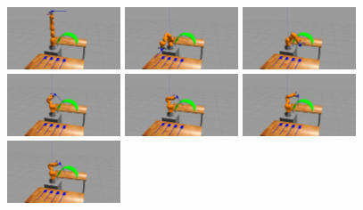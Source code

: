 \begin{center}
\begin{figure}[!htb]
\centering
\includegraphics[width=0.3\textwidth]{images/robot_planner1/robot_planner1_1}
\includegraphics[width=0.3\textwidth]{images/robot_planner1/robot_planner1_2}
\includegraphics[width=0.3\textwidth]{images/robot_planner1/robot_planner1_3}\\
\includegraphics[width=0.3\textwidth]{images/robot_planner1/robot_planner1_4}
\includegraphics[width=0.3\textwidth]{images/robot_planner1/robot_planner1_5}
\includegraphics[width=0.3\textwidth]{images/robot_planner1/robot_planner1_6}\\
\includegraphics[width=0.3\textwidth]{images/robot_planner1/robot_planner1_7}

\end{figure}
\end{center}

